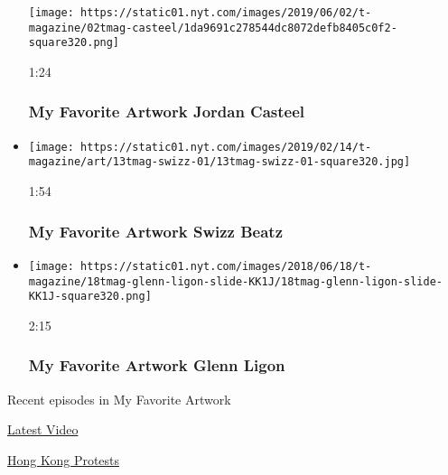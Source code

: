 \begin{itemize}
  \texttt{[image: https://static01.nyt.com/images/2019/06/02/t-magazine/02tmag-casteel/1da9691c278544dc8072defb8405c0f2-square320.png]}

  1:24

  \hypertarget{my-favorite-artwork--jordan-casteel}{%
  \subsubsection{My Favorite Artwork \textbar{} Jordan
  Casteel}\label{my-favorite-artwork--jordan-casteel}}
\item
  \href{https://www.nytimes.com/video/t-magazine/art/100000006354043/swizz-beatz-jordan-casteel.html?action=click\&module=video-series-bar\&region=header\&pgtype=Article\&playlistId=video/my-favorite-artwork}{}

  \texttt{[image: https://static01.nyt.com/images/2019/02/14/t-magazine/art/13tmag-swizz-01/13tmag-swizz-01-square320.jpg]}

  1:54

  \hypertarget{my-favorite-artwork--swizz-beatz}{%
  \subsubsection{My Favorite Artwork \textbar{} Swizz
  Beatz}\label{my-favorite-artwork--swizz-beatz}}
\item
  \href{https://www.nytimes.com/video/t-magazine/100000005951066/my-favorite-artwork-glenn-ligon.html?action=click\&module=video-series-bar\&region=header\&pgtype=Article\&playlistId=video/my-favorite-artwork}{}

  \texttt{[image: https://static01.nyt.com/images/2018/06/18/t-magazine/18tmag-glenn-ligon-slide-KK1J/18tmag-glenn-ligon-slide-KK1J-square320.png]}

  2:15

  \hypertarget{my-favorite-artwork--glenn-ligon}{%
  \subsubsection{My Favorite Artwork \textbar{} Glenn
  Ligon}\label{my-favorite-artwork--glenn-ligon}}
\end{itemize}

Recent episodes in My Favorite Artwork

\href{/video}{}

\href{/video/latest-video}{Latest Video}

\href{/video/hk-protest}{Hong Kong Protests}

